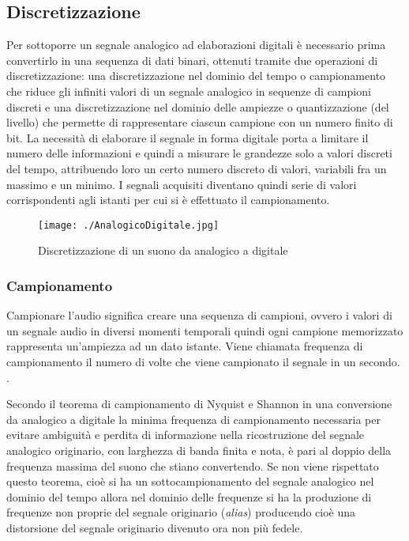 \subsection{Discretizzazione}
Per sottoporre un segnale analogico ad elaborazioni digitali \`e necessario prima convertirlo in una sequenza di dati binari, ottenuti tramite due operazioni di discretizzazione: una discretizzazione nel dominio del tempo o campionamento che riduce gli infiniti valori di un segnale analogico in sequenze di campioni discreti e una discretizzazione nel dominio delle ampiezze o quantizzazione (del livello) che permette di rappresentare ciascun campione con un numero finito di bit. 
La necessit\`a di elaborare il segnale in forma digitale porta a limitare il numero delle informazioni e quindi a misurare le grandezze solo a valori discreti del tempo, attribuendo loro un certo numero discreto di valori, variabili fra un massimo e un minimo. 
I segnali acquisiti diventano quindi serie di valori corrispondenti agli istanti per cui si \`e effettuato il campionamento.

\begin{figure}[h!]
 \centering
 \texttt{[image: ./AnalogicoDigitale.jpg]}
  \label{AnalogicoDigitale}
\caption{Discretizzazione di un suono da analogico a digitale}
\end{figure}

 
\subsubsection{Campionamento} 
Campionare l'audio significa creare una sequenza di campioni, ovvero i valori di un segnale audio in diversi momenti temporali quindi ogni campione memorizzato rappresenta un'ampiezza ad un dato istante. 
Viene chiamata frequenza di campionamento il numero di volte che viene campionato il segnale in un secondo.  \cite{elabA}.


Secondo il teorema di campionamento di Nyquist e Shannon in una conversione da analogico a digitale la minima frequenza di campionamento necessaria per evitare ambiguit\`a e perdita di informazione nella ricostruzione del segnale analogico originario, con larghezza di banda finita e nota, \`e pari al doppio della frequenza massima del suono che stiano convertendo.
Se non viene rispettato questo teorema, cio\`e si ha un sottocampionamento del segnale analogico nel dominio del tempo allora nel dominio delle frequenze si ha la produzione di frequenze non proprie del segnale originario (\textit{alias}) producendo cio\`e una distorsione del segnale originario divenuto ora non pi\`u fedele.

